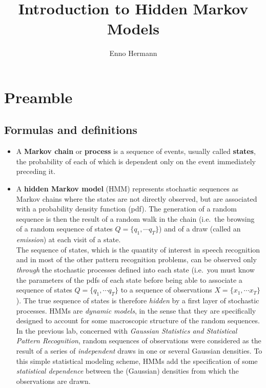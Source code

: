 \documentclass[11pt]{article}
\author{Enno Hermann}
\date{}
\title{Introduction to Hidden Markov Models}
\begin{document}
\maketitle
\tableofcontents


\section{Preamble}
\label{sec:org3b83407}
\subsection{Formulas and definitions}
\label{sec:org143c042}
\begin{itemize}
\item A \textbf{Markov chain} or \textbf{process} is a sequence of events, usually called
\textbf{states}, the probability of each of which is dependent only on the
event immediately preceding it.
\item A \textbf{hidden Markov model} (HMM) represents stochastic sequences as
Markov chains where the states are not directly observed, but are
associated with a probability density function (pdf). The generation
of a random sequence is then the result of a random walk in the chain
(i.e. the browsing of a random sequence of states
\(Q=\{q_1,\cdots q_T\}\)) and of a draw (called an \emph{emission}) at each
visit of a state.\\
The sequence of states, which is the quantity of interest in speech
recognition and in most of the other pattern recognition problems, can
be observed only \emph{through} the stochastic processes defined into each
state (i.e. you must know the parameters of the pdfs of each state
before being able to associate a sequence of states
\(Q=\{q_1,\cdots q_T\}\) to a sequence of observations
\(X=\{x_1,\cdots x_T\}\)). The true sequence of states is therefore
\emph{hidden} by a first layer of stochastic processes. HMMs are
\emph{dynamic models}, in the sense that they are specifically designed to
account for some macroscopic structure of the random sequences. In the
previous lab, concerned with \emph{Gaussian Statistics and Statistical
Pattern Recognition}, random sequences of observations were considered
as the result of a series of \emph{independent} draws in one or several
Gaussian densities. To this simple statistical modeling scheme, HMMs
add the specification of some \emph{statistical dependence} between the
(Gaussian) densities from which the observations are drawn.
\end{itemize}
\end{document}
